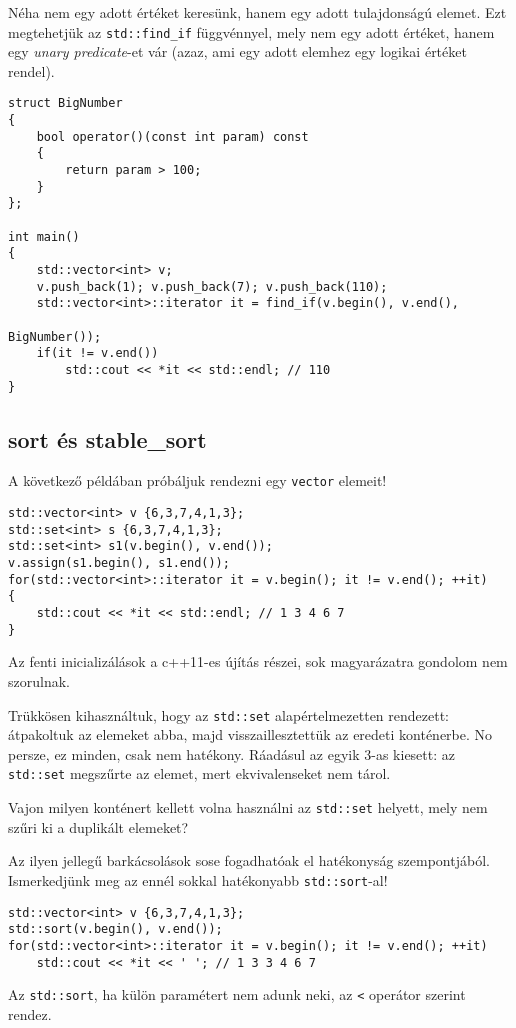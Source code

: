 \documentclass[../cpp_book/cpp_book.tex]{subfiles}
\begin{document}
	\medskip
	Néha nem egy adott értéket keresünk, hanem egy adott tulajdonságú elemet. Ezt megtehetjük az \texttt{std::find\_if} függvénnyel, mely nem egy adott értéket, hanem egy \textit{unary predicate}-et vár (azaz, ami egy adott elemhez egy logikai értéket rendel).
	\begin{lstlisting}
struct BigNumber
{
	bool operator()(const int param) const
	{
		return param > 100;
	}
};

int main()
{
	std::vector<int> v;
	v.push_back(1);	v.push_back(7);	v.push_back(110);
	std::vector<int>::iterator it = find_if(v.begin(), v.end(),
															   BigNumber());
	if(it != v.end())
		std::cout << *it << std::endl; // 110
}
	\end{lstlisting}
	\subsection{sort és stable\_sort}
	A következő példában próbáljuk rendezni egy \texttt{vector} elemeit!
	\begin{lstlisting}
std::vector<int> v {6,3,7,4,1,3};
std::set<int> s {6,3,7,4,1,3};
std::set<int> s1(v.begin(), v.end());
v.assign(s1.begin(), s1.end());
for(std::vector<int>::iterator it = v.begin(); it != v.end(); ++it)
{
	std::cout << *it << std::endl; // 1 3 4 6 7 
}
	\end{lstlisting}
%	
	\begin{note}
		Az fenti inicializálások a c++11-es újítás részei, sok magyarázatra gondolom nem szorulnak.
	\end{note}
	Trükkösen kihasználtuk, hogy az \texttt{std::set} alapértelmezetten rendezett: átpakoltuk az elemeket abba, majd visszaillesztettük az eredeti konténerbe. No persze, ez minden, csak nem hatékony. Ráadásul az egyik 3-as kiesett: az \texttt{std::set} megszűrte az elemet, mert ekvivalenseket nem tárol.
	\begin{note}
		Vajon milyen konténert kellett volna használni az \texttt{std::set} helyett, mely nem szűri ki a duplikált elemeket?
	\end{note}
	Az ilyen jellegű barkácsolások sose fogadhatóak el hatékonyság szempontjából. Ismerkedjünk meg az ennél sokkal hatékonyabb \texttt{std::sort}-al!
	\begin{lstlisting}
std::vector<int> v {6,3,7,4,1,3};
std::sort(v.begin(), v.end());
for(std::vector<int>::iterator it = v.begin(); it != v.end(); ++it)
	std::cout << *it << ' '; // 1 3 3 4 6 7
	\end{lstlisting}
	Az \texttt{std::sort}, ha külön paramétert nem adunk neki, az \texttt{<} operátor szerint rendez.
	
\end{document}
